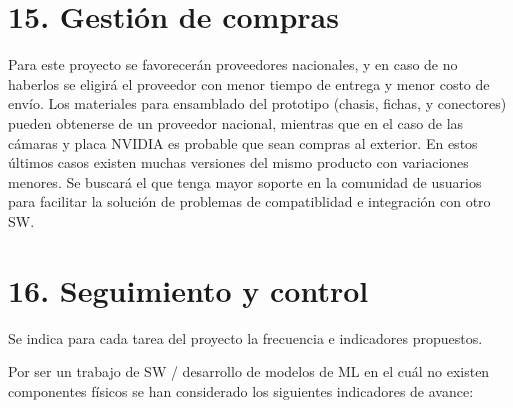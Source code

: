 \documentclass[11pt]{charter}
\begin{document}
\section{15. Gestión de compras}
\label{sec:compras}

Para este proyecto se favorecerán proveedores nacionales, y en caso de no haberlos se eligirá el proveedor con menor tiempo de entrega y menor costo de envío.
Los materiales para ensamblado del prototipo (chasis, fichas, y conectores) pueden obtenerse de un proveedor nacional, mientras que en el caso de las cámaras y placa NVIDIA es probable que sean compras al exterior. En estos últimos casos existen muchas versiones del mismo producto con variaciones menores. Se buscará el que tenga mayor soporte en la comunidad de usuarios para facilitar la solución de problemas de compatiblidad e integración con otro SW.

\section{16. Seguimiento y control}
\label{sec:seguimiento}

Se indica para cada tarea del proyecto la frecuencia e indicadores propuestos.

Por ser un trabajo de SW / desarrollo de modelos de ML en el cuál no existen componentes físicos se han considerado los siguientes indicadores de avance:
\end{document}
